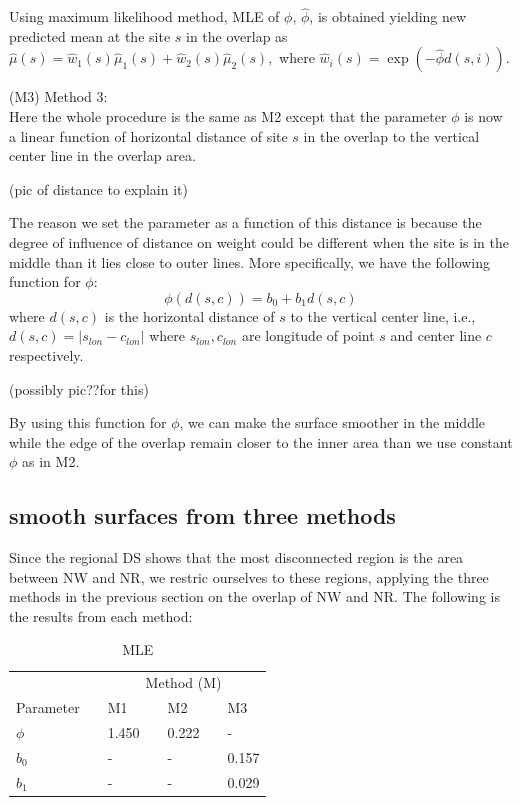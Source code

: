 \documentclass[10pt]{article}
\theoremstyle{plain}
\theoremstyle{definition}
\theoremstyle{remark}
\begin{document}
Using maximum likelihood method, MLE of $\phi$, $\hat{\phi}$, is obtained yielding new predicted mean at the site $s$ in the overlap as
${\hat\mu(s)} ={\hat w_{1}(s)}{\hat \mu_{1}(s)}+ {\hat w_{2}(s)}{\hat \mu_{2}(s)},   $ where ${\hat w_{i}(s)}=\exp(-\hat{\phi} d(s,i)).$\\
\par (M3) Method 3:\\ 
Here the whole procedure is the same as M2 except that the parameter $\phi$ is  now  a linear function of horizontal distance of site $s$ in the overlap to the
vertical center line in the overlap area.

(pic of distance to explain it)

The reason we set the parameter as a function of this distance is because  the degree of influence of distance on weight could be different when the site is in the middle than it lies close to outer lines.
More specifically, we have the following function for $ \phi$: 
\[ \phi(d(s,c))= b_0+b_1 d(s,c)   \] where $d(s,c)$ is the horizontal distance of $s$ to the  vertical center line, i.e.,  $d(s,c)=|s_{lon}-c_{lon}|$ where
$s_{lon}, c_{lon}$ are longitude of point $s$ and center line $c$ respectively.

(possibly pic??for this)

By using this function for $\phi$, we can make the surface smoother in the middle while the edge of the overlap remain closer to the inner area than we use constant $\phi$ as in M2.



\subsection{smooth surfaces from three methods}
Since the regional DS shows that the most disconnected region is the area between NW and NR, we restric ourselves to these regions, 
applying the three methods in the previous section on the overlap of NW and NR.
The following is the results from each method:


\begin{table}[!ht]
	\centering
	\caption{MLE}
	\label{table:name of table for referncing}
	\begin{tabular}{ l l l l l l l} 
		\toprule
		& &  \multicolumn{5}{c}{Method (M)} \\ \cmidrule(l){3-7} 
		Parameter & &  M1      & &  M2       & &   M3 \\
		\toprule
		$\phi$    & &   1.450  & &  0.222    & &   -    \\
		$b_{0}$   & &   -      & &  -        & &   0.157 \\
		$b_{1}$   & &   -      & &  -        & &   0.029 \\
		\bottomrule
	\end{tabular}
\end{table}
\end{document}
